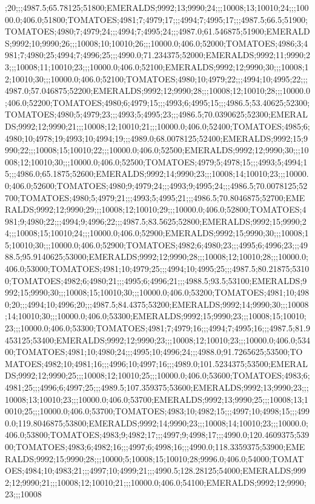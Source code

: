 ;20;;;4987.5;65.78125;51800;EMERALDS;9992;13;9990;24;;;10008;13;10010;24;;;10000.0;406.0;51800;TOMATOES;4981;7;4979;17;;;4994;7;4995;17;;;4987.5;66.5;51900;TOMATOES;4980;7;4979;24;;;4994;7;4995;24;;;4987.0;61.546875;51900;EMERALDS;9992;10;9990;26;;;10008;10;10010;26;;;10000.0;406.0;52000;TOMATOES;4986;3;4981;7;4980;25;4994;7;4996;25;;;4990.0;71.234375;52000;EMERALDS;9992;11;9990;23;;;10008;11;10010;23;;;10000.0;406.0;52100;EMERALDS;9992;12;9990;30;;;10008;12;10010;30;;;10000.0;406.0;52100;TOMATOES;4980;10;4979;22;;;4994;10;4995;22;;;4987.0;57.046875;52200;EMERALDS;9992;12;9990;28;;;10008;12;10010;28;;;10000.0;406.0;52200;TOMATOES;4980;6;4979;15;;;4993;6;4995;15;;;4986.5;53.40625;52300;TOMATOES;4980;5;4979;23;;;4993;5;4995;23;;;4986.5;70.0390625;52300;EMERALDS;9992;12;9990;21;;;10008;12;10010;21;;;10000.0;406.0;52400;TOMATOES;4985;6;4980;10;4978;19;4993;10;4994;19;;;4989.0;68.0078125;52400;EMERALDS;9992;15;9990;22;;;10008;15;10010;22;;;10000.0;406.0;52500;EMERALDS;9992;12;9990;30;;;10008;12;10010;30;;;10000.0;406.0;52500;TOMATOES;4979;5;4978;15;;;4993;5;4994;15;;;4986.0;65.1875;52600;EMERALDS;9992;14;9990;23;;;10008;14;10010;23;;;10000.0;406.0;52600;TOMATOES;4980;9;4979;24;;;4993;9;4995;24;;;4986.5;70.0078125;52700;TOMATOES;4980;5;4979;21;;;4993;5;4995;21;;;4986.5;70.8046875;52700;EMERALDS;9992;12;9990;29;;;10008;12;10010;29;;;10000.0;406.0;52800;TOMATOES;4981;9;4980;22;;;4994;9;4996;22;;;4987.5;83.5625;52800;EMERALDS;9992;15;9990;24;;;10008;15;10010;24;;;10000.0;406.0;52900;EMERALDS;9992;15;9990;30;;;10008;15;10010;30;;;10000.0;406.0;52900;TOMATOES;4982;6;4980;23;;;4995;6;4996;23;;;4988.5;95.9140625;53000;EMERALDS;9992;12;9990;28;;;10008;12;10010;28;;;10000.0;406.0;53000;TOMATOES;4981;10;4979;25;;;4994;10;4995;25;;;4987.5;80.21875;53100;TOMATOES;4982;6;4980;21;;;4995;6;4996;21;;;4988.5;93.5;53100;EMERALDS;9992;15;9990;30;;;10008;15;10010;30;;;10000.0;406.0;53200;TOMATOES;4981;10;4980;20;;;4994;10;4996;20;;;4987.5;84.4375;53200;EMERALDS;9992;14;9990;30;;;10008;14;10010;30;;;10000.0;406.0;53300;EMERALDS;9992;15;9990;23;;;10008;15;10010;23;;;10000.0;406.0;53300;TOMATOES;4981;7;4979;16;;;4994;7;4995;16;;;4987.5;81.9453125;53400;EMERALDS;9992;12;9990;23;;;10008;12;10010;23;;;10000.0;406.0;53400;TOMATOES;4981;10;4980;24;;;4995;10;4996;24;;;4988.0;91.7265625;53500;TOMATOES;4982;10;4981;16;;;4996;10;4997;16;;;4989.0;101.5234375;53500;EMERALDS;9992;12;9990;25;;;10008;12;10010;25;;;10000.0;406.0;53600;TOMATOES;4983;6;4981;25;;;4996;6;4997;25;;;4989.5;107.359375;53600;EMERALDS;9992;13;9990;23;;;10008;13;10010;23;;;10000.0;406.0;53700;EMERALDS;9992;13;9990;25;;;10008;13;10010;25;;;10000.0;406.0;53700;TOMATOES;4983;10;4982;15;;;4997;10;4998;15;;;4990.0;119.8046875;53800;EMERALDS;9992;14;9990;23;;;10008;14;10010;23;;;10000.0;406.0;53800;TOMATOES;4983;9;4982;17;;;4997;9;4998;17;;;4990.0;120.4609375;53900;TOMATOES;4983;6;4982;16;;;4997;6;4998;16;;;4990.0;118.3359375;53900;EMERALDS;9992;15;9990;28;;;10000;5;10008;15;10010;28;9996.0;406.0;54000;TOMATOES;4984;10;4983;21;;;4997;10;4999;21;;;4990.5;128.28125;54000;EMERALDS;9992;12;9990;21;;;10008;12;10010;21;;;10000.0;406.0;54100;EMERALDS;9992;12;9990;23;;;10008